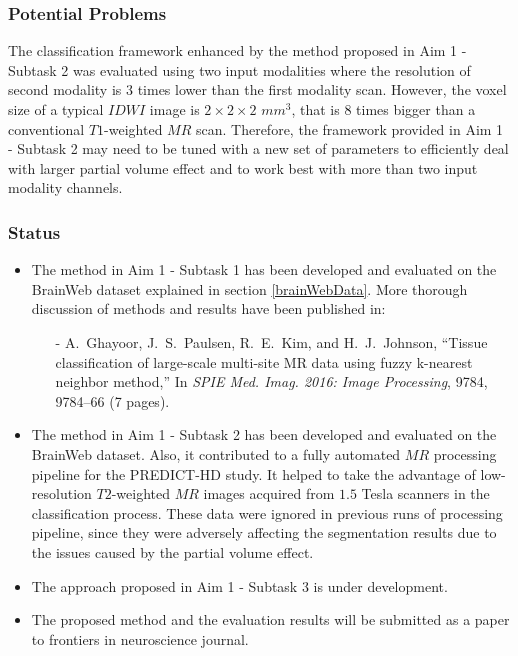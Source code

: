 \subsubsection{Potential Problems}

The classification framework enhanced by the method proposed in Aim 1 - Subtask 2 was evaluated using two input modalities where the resolution of second modality is $3$ times lower than the first modality scan. However, the voxel size of a typical $IDWI$ image is $2 \times 2 \times 2$  $mm^3$, that is $8$ times bigger than a conventional $T1$-weighted $MR$ scan. Therefore, the framework provided in Aim 1 - Subtask 2 may need to be tuned with a new set of parameters to efficiently deal with larger partial volume effect and to work best with more than two input modality channels.
\newline

\subsubsection{Status}
\begin{itemize}
    \item The method in Aim 1 - Subtask 1 has been developed and evaluated on the BrainWeb dataset explained in section \ref{brainWebData}. More thorough discussion of methods and results have been published in:
    \begin{itemize}
        \item[-] {A.~Ghayoor}, J.~S.~Paulsen, R.~E.~Kim, and H.~J.~Johnson, ``Tissue classification of large-scale multi-site MR data using fuzzy k-nearest neighbor method,'' In \textit{SPIE Med. Imag. 2016: Image Processing}, 9784, 9784–66 (7 pages).
    \end{itemize}

    \item The method in Aim 1 - Subtask 2 has been developed and evaluated on the BrainWeb dataset. Also, it contributed to a fully automated $MR$ processing pipeline for the PREDICT-HD study. It helped to take the advantage of low-resolution $T2$-weighted $MR$ images acquired from $1.5$ Tesla scanners in the classification process. These data were ignored in previous runs of processing pipeline, since they were adversely affecting the segmentation results due to the issues caused by the partial volume effect.

    \item The approach proposed in Aim 1 - Subtask 3 is under development.

    \item The proposed method and the evaluation results will be submitted as a paper to frontiers in neuroscience journal.
\end{itemize}

